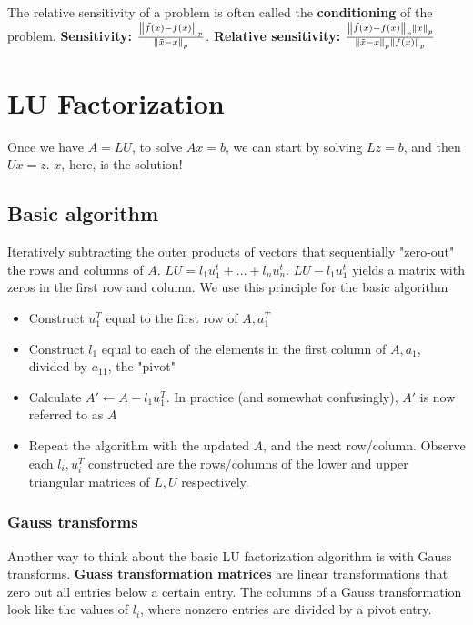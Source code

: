 \documentclass{article}
\newcommand{\norm}[2]{\left\lVert#1\right\rVert_#2}
\begin{document}
\begin{itemize}
{The relative sensitivity of a problem is often called the \textbf{conditioning} of the problem. \textbf{Sensitivity:} $\frac{\norm{\Tilde{f}(x) - f(x)}{p}}{\norm{\Tilde{x} - x}{p}}$. \textbf{Relative sensitivity:} $\frac{\norm{\Tilde{f}(x) - f(x)}{p}\norm{x}{p}}{\norm{\Tilde{x} - x}{p}\norm{f(x)}{p}}$


\section{LU Factorization}
Once we have $A=LU$, to solve $Ax=b$, we can start by solving $Lz=b$, and then $Ux=z$. $x$, here, is the solution!

\subsection{Basic algorithm}
Iteratively subtracting the outer products of vectors that sequentially "zero-out" the rows and columns of $A$. $LU = l_1u_1^t + \dots + l_nu_n^t$. $LU - l_1u_1^t$ yields a matrix with zeros in the first row and column. We use this principle for the basic algorithm 
\begin{itemize}
    \item Construct $u_1^T$ equal to the first row of $A, a_1^T$
    \item Construct $l_1$ equal to each of the elements in the first column of $A, a_1$, divided by $a_{11}$, the "pivot"
    \item Calculate $A' \leftarrow A - l_1u_1^T$. In practice (and somewhat confusingly), $A'$ is now referred to as $A$
    \item Repeat the algorithm with the updated $A$, and the next row/column. Observe each $l_i, u_i^T$ constructed are the rows/columns of the lower and upper triangular matrices of $L, U$ respectively.
\end{itemize}

\subsubsection{Gauss transforms}
Another way to think about the basic LU factorization algorithm is with Gauss transforms. \textbf{Guass transformation matrices} are linear transformations that zero out all entries below a certain entry. The columns of a Gauss transformation look like the values of $l_i$, where nonzero entries are divided by a pivot entry.

}
\end{itemize}
\end{document}

